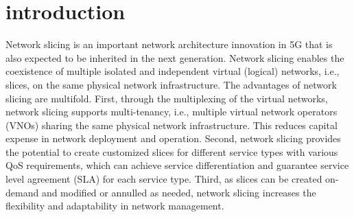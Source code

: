 \documentclass{article}
\begin{document}
\section{introduction}
Network slicing is an important network architecture innovation in 5G that is also expected to be inherited in the next generation. Network slicing enables the coexistence of
multiple isolated and independent virtual (logical) networks,
i.e., slices, on the same physical network infrastructure. The
advantages of network slicing are multifold. First, through the
multiplexing of the virtual networks, network slicing supports
multi-tenancy, i.e., multiple virtual network operators (VNOs)
sharing the same physical network infrastructure. This
reduces capital expense in network deployment and operation. Second, network slicing provides the potential to create customized slices for different service types with various
QoS requirements, which can achieve service differentiation
and guarantee service level agreement (SLA) for each service
type. Third, as slices can be created on-demand and modified
or annulled as needed, network slicing increases the flexibility
and adaptability in network management.
\end{document}
